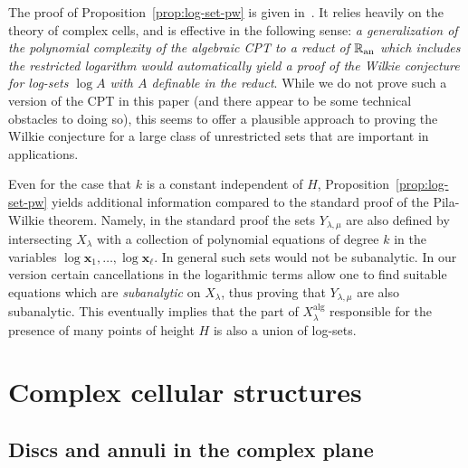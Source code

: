 \documentclass[reqno]{amsart}
\renewcommand\~[1]{\widetilde{#1}}
\def\vx{{\mathbf x}}
\def\an{{\text{an}}}
\def\alg{\mathrm{alg}}
\begin{document}
The proof of Proposition~\ref{prop:log-set-pw} is given
in~. It relies heavily on the theory of
complex cells, and is effective in the following sense: \emph{a
  generalization of the polynomial complexity of the algebraic CPT to
  a reduct of $\R_\an$ which includes the \emph{restricted} logarithm
  would automatically yield a proof of the Wilkie conjecture for
  log-sets $\log A$ with $A$ definable in the reduct}. While we do not
prove such a version of the CPT in this paper (and there appear to be
some technical obstacles to doing so), this seems to offer a plausible
approach to proving the Wilkie conjecture for a large class of
unrestricted sets that are important in applications.

Even for the case that $k$ is a constant independent of $H$,
Proposition~\ref{prop:log-set-pw} yields additional information
compared to the standard proof of the Pila-Wilkie theorem. Namely, in
the standard proof the sets $Y_{\lambda,\mu}$ are also defined by
intersecting $X_\lambda$ with a collection of polynomial equations of
degree $k$ in the variables $\log \vx_1,\ldots,\log \vx_\ell$. In
general such sets would not be subanalytic. In our version certain
cancellations in the logarithmic terms allow one to find suitable
equations which are \emph{subanalytic} on $X_\lambda$, thus proving
that $Y_{\lambda,\mu}$ are also subanalytic. This eventually implies
that the part of $X_\lambda^\alg$ responsible for the presence of many
points of height $H$ is also a union of log-sets.


\section{Complex cellular structures}
\label{sec:complex-cells}

\subsection{Discs and annuli in the complex plane}
\end{document}
